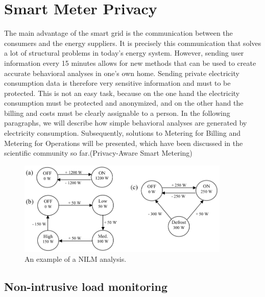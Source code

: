 \section{Smart Meter Privacy}
The main advantage of the smart grid is the communication between the consumers and the energy suppliers. It is precisely this communication that solves a lot of structural problems in today's energy system. However, sending user information every 15 minutes allows for new methods that can be used to create accurate behavioral analyses in one's own home. Sending private electricity consumption data is therefore very sensitive information and must to be protected. This is not an easy task, because on the one hand the electricity consumption must be protected and anonymized, and on the other hand the billing and costs must be clearly assignable to a person. In the following paragraphs, we will describe how simple behavioral analyses are generated by electricity consumption. Subsequently, solutions to Metering for Billing and Metering for Operations will be presented, which have been discussed in the scientific community so far.(Privacy-Aware Smart Metering) \begin{figure}[htbp!]
  \centering
  \includegraphics[width=0.9\textwidth]{images/Appliance_Model.png}
  \caption[Short description]{An example of a NILM analysis.}
  \label{fig:Appliance_Model}
\end{figure}
\subsection{Non-intrusive load monitoring} 

